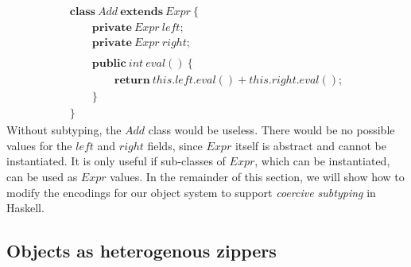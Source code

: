 \begin{displaymath}
\begin{array}{l}
\mathbf{class}~\mathit{Add}~\mathbf{extends}~\mathit{Expr}~\{\\
\qquad \mathbf{private}~\mathit{Expr}~\mathit{left};\\
\qquad \mathbf{private}~\mathit{Expr}~\mathit{right};\\\\
\qquad \mathbf{public}~\mathit{int}~\mathit{eval}()~\{\\
\qquad \qquad \mathbf{return}~\mathit{this}.\mathit{left}.\mathit{eval}() + \mathit{this}.\mathit{right}.\mathit{eval}();\\
\qquad \}\\
\}
\end{array}
\end{displaymath}
Without subtyping, the $\mathit{Add}$ class would be useless. There would be no possible values for the $\mathit{left}$ and $\mathit{right}$ fields, since $\mathit{Expr}$ itself is abstract and cannot be instantiated. It is only useful if sub-classes of $\mathit{Expr}$, which can be instantiated, can be used as $\mathit{Expr}$ values. In the remainder of this section, we will show how to modify the encodings for our object system to support \emph{coercive subtyping} in Haskell.

\subsection{Objects as heterogenous zippers}

